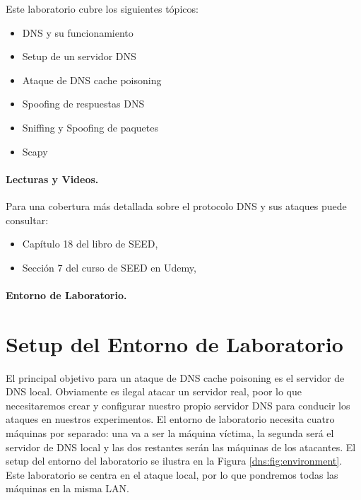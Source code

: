 Este laboratorio cubre los siguientes tópicos:


\begin{itemize}[noitemsep]
\item DNS y su funcionamiento
\item Setup de un servidor DNS
\item Ataque de DNS cache poisoning
\item Spoofing de respuestas DNS
\item Sniffing y Spoofing de paquetes
\item Scapy
\end{itemize}


\paragraph{Lecturas y Videos.}
Para una cobertura más detallada sobre el protocolo DNS y sus ataques puede consultar:

\begin{itemize}
\item Capítulo 18 del libro de SEED, \seedbook
\item Sección 7 del curso de SEED en Udemy, \seedisvideo
\end{itemize}


\paragraph{Entorno de Laboratorio.} \seedenvironmentC


\section{Setup del Entorno de Laboratorio}
\label{sec:environment}

El principal objetivo para un ataque de DNS cache poisoning es el servidor de DNS  local. Obviamente es ilegal atacar un servidor real, poor lo que necesitaremos crear y configurar nuestro propio servidor DNS para conducir los ataques en nuestros experimentos. El entorno de laboratorio necesita cuatro máquinas por separado:
una va a ser la máquina víctima, la segunda será el servidor de DNS local y las dos restantes serán las máquinas de los atacantes.
El setup del entorno del laboratorio se ilustra en la Figura \ref{dns:fig:environment}.
Este laboratorio se centra en el ataque local, por lo que pondremos todas las máquinas en la misma LAN.


